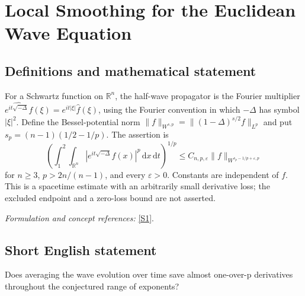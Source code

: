 \documentclass[11pt]{article}
\newcommand{\R}{\mathbb{R}}
\newcommand{\eps}{\varepsilon}
\newcommand{\dd}{\,\mathrm d}
\newcommand{\sref}[2]{\hyperlink{source:#1:#2}{[S#2]}}
\newif\ifshowcatalogue
\newcommand{\cataloguescope}[1]{\ifshowcatalogue
	\paragraph{Exact scope in the supplied catalogue.}
	\begin{quote}\small #1\end{quote}\fi}
\begin{document}
\setcounter{section}{0}
	\clearpage
\section*{\texorpdfstring{Local Smoothing for the Euclidean Wave Equation}{Local Smoothing for the Euclidean Wave Equation}}\label{30004844}
	\subsection{Definitions and mathematical statement}
	For a Schwartz function on $\R^n$, the half-wave propagator is the Fourier multiplier
	$\widehat{e^{it\sqrt{-\Delta}}f}(\xi)=e^{it|\xi|}\widehat f(\xi)$, using the Fourier convention in which $-\Delta$ has symbol $|\xi|^2$. Define the Bessel-potential norm
	$\|f\|_{W^{s,p}}=\|(1-\Delta)^{s/2}f\|_{L^p}$ and put $s_p=(n-1)(1/2-1/p)$. The assertion is
	\[
	\left(\int_1^2\int_{\R^n}|e^{it\sqrt{-\Delta}}f(x)|^p\dd x\dd t\right)^{1/p}
	\le C_{n,p,\eps}\|f\|_{W^{s_p-1/p+\eps,p}}
	\]
	for $n\ge3$, $p>2n/(n-1)$, and every $\eps>0$. Constants are independent of $f$. This is a spacetime estimate with an arbitrarily small derivative loss; the excluded endpoint and a zero-loss bound are not asserted.
	\par\smallskip\textit{Formulation and concept references:} \sref{30004844}{1}.
	\cataloguescope{For every n >= 3, p > 2n/(n-1), and epsilon > 0, prove ||exp(it sqrt(-Delta))f||\_\{L\textasciicircum{}p(R\textasciicircum{}n x [1,2])\} <= C\_\{p,epsilon\} ||f||\_\{W\textasciicircum{}\{s\_p-1/p+epsilon,p\}(R\textasciicircum{}n)\}, where s\_p=(n-1)(1/2-1/p).}
	\subsection{Short English statement}
	Does averaging the wave evolution over time save almost one-over-p derivatives throughout the conjectured range of exponents?
\end{document}

